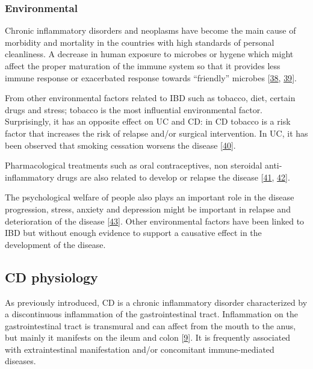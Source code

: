 \documentclass[
  12pt,
  a4paper,
  twoside,
  openright]{book}
\begin{document}
\hypertarget{environmental}{%
\subsubsection{Environmental}\label{environmental}}

Chronic inflammatory disorders and neoplasms have become the main cause of morbidity and mortality in the countries with high standards of personal cleanliness.
A decrease in human exposure to microbes or hygene which might affect the proper maturation of the immune system so that it provides less immune response or exacerbated response towards ``friendly'' microbes {[}\protect\hyperlink{ref-strachan1989}{38}, \protect\hyperlink{ref-scudellari2017}{39}{]}.

From other environmental factors related to IBD such as tobacco, diet, certain drugs and stress; tobacco is the most influential environmental factor.
Surprisingly, it has an opposite effect on UC and CD: in CD tobacco is a risk factor that increases the risk of relapse and/or surgical intervention.
In UC, it has been observed that smoking cessation worsens the disease {[}\protect\hyperlink{ref-thomas1998}{40}{]}.

Pharmacological treatments such as oral contraceptives, non steroidal anti-inflammatory drugs are also related to develop or relapse the disease {[}\protect\hyperlink{ref-cornish2008}{41}, \protect\hyperlink{ref-kaufmann1987}{42}{]}.

The psychological welfare of people also plays an important role in the disease progression, stress, anxiety and depression might be important in relapse and deterioration of the disease {[}\protect\hyperlink{ref-bitton2008}{43}{]}.
Other environmental factors have been linked to IBD but without enough evidence to support a causative effect in the development of the disease.

\hypertarget{CD}{%
\subsection{CD physiology}\label{CD}}

As previously introduced, CD is a chronic inflammatory disorder characterized by a discontinuous inflammation of the gastrointestinal tract.
Inflammation on the gastrointestinal tract is transmural and can affect from the mouth to the anus, but mainly it manifests on the ileum and colon {[}\protect\hyperlink{ref-demattos2015}{9}{]}.
It is frequently associated with extraintestinal manifestation and/or concomitant immune-mediated diseases.
\end{document}
